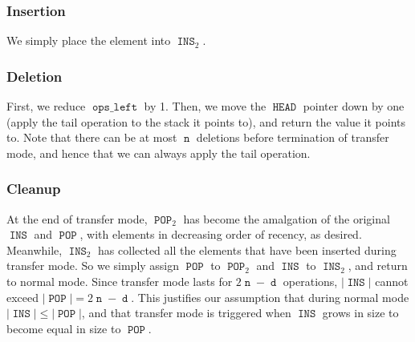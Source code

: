 \documentclass[12.5pt]{scrartcl}
\DeclareMathOperator{\INS}{\mathtt{INS}}
\DeclareMathOperator{\POP}{\mathtt{POP}}
\DeclareMathOperator{\HEAD}{\mathtt{HEAD}}
\DeclareMathOperator{\opsleft}{\mathtt{ops\_left}}
\DeclareMathOperator{\n}{\mathtt{n}}
\DeclareMathOperator{\dd}{\mathtt{d}}
\begin{document}
\subsubsection{Insertion} We simply place the element into $\INS_2$.

\subsubsection{Deletion} First, we reduce $\opsleft$ by 1. Then, we move the $\HEAD$ pointer down by one (apply the tail operation to the stack it points to), and return the value it points to. Note that there can be at most $\n$ deletions before termination of transfer mode, and hence that we can always apply the tail operation.

\subsubsection{Cleanup} At the end of transfer mode, $\POP_2$ has become the amalgation of the original $\INS$ and $\POP$, with elements in decreasing order of recency, as desired. Meanwhile, $\INS_2$ has collected all the elements that have been inserted during transfer mode. So we simply assign $\POP$ to $\POP_2$ and $\INS$ to $\INS_2$, and return to normal mode. Since transfer mode lasts for $2\n - \dd$ operations, $|\INS|$ cannot exceed $|\POP| = 2\n - \dd$. This justifies our assumption that during normal mode $|\INS| \leq |\POP|$, and that transfer mode is triggered when $\INS$ grows in size to become equal in size to $\POP$. 

\nocite{hood}

\printbibliography
\end{document}
